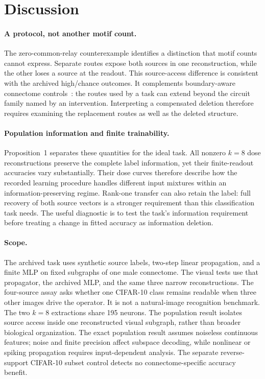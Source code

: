 \section{Discussion}
\label{sec:discussion}

\paragraph{A protocol, not another motif count.}
The zero-common-relay counterexample identifies a distinction that motif
counts cannot express. Separate routes expose both sources in one
reconstruction, while the other loses a source at the readout. This
source-access difference is consistent with the archived high/chance
outcomes. It complements boundary-aware connectome controls~\cite{park2026}:
the routes used by a task can extend beyond the circuit family named by
an intervention. Interpreting a compensated deletion therefore requires
examining the replacement routes as well as the deleted structure.

\paragraph{Population information and finite trainability.}
Proposition~1 separates these quantities for the ideal task. All nonzero
$k=8$ dose reconstructions preserve the complete label information, yet
their finite-readout accuracies vary substantially. Their dose curves
therefore describe how the recorded learning procedure handles different
input mixtures within an information-preserving regime. Rank-one transfer
can also retain the label: full recovery of both source vectors is a
stronger requirement than this classification task needs. The useful
diagnostic is to test the task's information requirement before treating
a change in fitted accuracy as information deletion.

\paragraph{Scope.}
The archived task uses synthetic source labels, two-step linear propagation,
and a finite MLP on fixed subgraphs of one male connectome. The visual tests
use that propagator, the archived MLP, and the same three narrow
reconstructions. The four-source assay asks whether one CIFAR-10 class remains
readable when three other images drive the operator. It is not a
natural-image recognition benchmark. The two $k=8$
extractions share 195 neurons. The population result isolates source access
inside one reconstructed visual subgraph, rather than broader biological
organization. The exact population result assumes
noiseless continuous features; noise and finite precision affect subspace
decoding, while nonlinear or spiking propagation requires input-dependent
analysis. The separate reverse-support CIFAR-10 subset control detects no
connectome-specific accuracy benefit.

